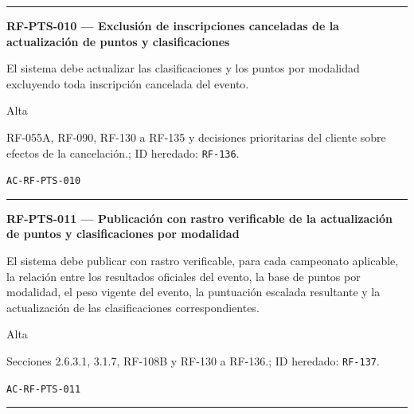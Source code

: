 \documentclass[10pt,letterpaper]{article}
\begin{document}
\vspace{0.25em}\hrule\vspace{0.65em}
\noindent\textbf{RF-PTS-010 --- Exclusión de inscripciones canceladas de la actualización de puntos y clasificaciones}\par
\begin{description}[style=nextline,leftmargin=3.15cm,labelwidth=2.8cm,font=\normalfont\bfseries]
\item[Obligación] El sistema debe actualizar las clasificaciones y los puntos por modalidad excluyendo toda inscripción cancelada del evento.
\item[Prioridad] Alta
\item[Procedencia] RF-055A, RF-090, RF-130 a RF-135 y decisiones prioritarias del cliente sobre efectos de la cancelación.; ID heredado: \texttt{RF-136}.
\item[Verificación] \texttt{AC-RF-PTS-010}
\end{description}
\vspace{0.25em}\hrule\vspace{0.65em}
\noindent\textbf{RF-PTS-011 --- Publicación con rastro verificable de la actualización de puntos y clasificaciones por modalidad}\par
\begin{description}[style=nextline,leftmargin=3.15cm,labelwidth=2.8cm,font=\normalfont\bfseries]
\item[Obligación] El sistema debe publicar con rastro verificable, para cada campeonato aplicable, la relación entre los resultados oficiales del evento, la base de puntos por modalidad, el peso vigente del evento, la puntuación escalada resultante y la actualización de las clasificaciones correspondientes.
\item[Prioridad] Alta
\item[Procedencia] Secciones 2.6.3.1, 3.1.7, RF-108B y RF-130 a RF-136.; ID heredado: \texttt{RF-137}.
\item[Verificación] \texttt{AC-RF-PTS-011}
\end{description}
\vspace{0.25em}\hrule\vspace{0.65em}
\end{document}
